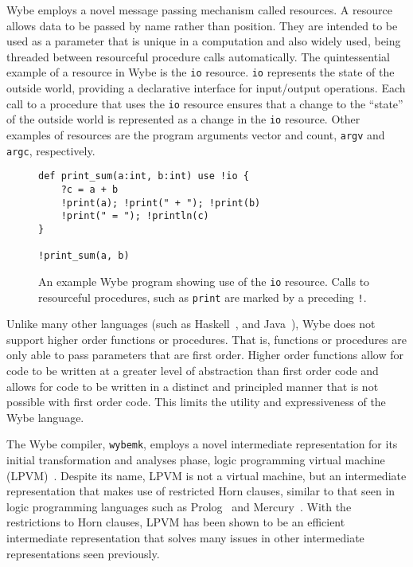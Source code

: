 Wybe employs a novel message passing mechanism called resources. A resource allows data to be passed by name rather than position. They are intended to be used as a parameter that is unique in a computation and also widely used, being threaded between resourceful procedure calls automatically. The quintessential example of a resource in Wybe is the \texttt{io} resource. \texttt{io} represents the state of the outside world, providing a declarative interface for input/output operations. Each call to a procedure that uses the \texttt{io} resource ensures that a change to the ``state'' of the outside world is represented as a change in the \texttt{io} resource. Other examples of resources are the program arguments vector and count, \texttt{argv} and \texttt{argc}, respectively.

\begin{figure}[ht]
  \centering
  \begin{varwidth}{\linewidth}
    \begin{verbatim}
def print_sum(a:int, b:int) use !io {
    ?c = a + b
    !print(a); !print(" + "); !print(b)
    !print(" = "); !println(c)
}

!print_sum(a, b)
\end{verbatim}
  \end{varwidth}
  \caption{An example Wybe program showing use of the \texttt{io} resource. Calls to resourceful procedures, such as \texttt{print} are marked by a preceding \texttt{!}.}
  \label{fig:wybe-resource-example}
\end{figure}

Unlike many other languages (such as Haskell~\cite{jones2003haskell}, and Java~\cite{mazinanian2017understanding}), Wybe does not support higher order functions or procedures. That is, functions or procedures are only able to pass parameters that are first order. Higher order functions allow for code to be written at a greater level of abstraction than first order code and allows for code to be written in a distinct and principled manner that is not possible with first order code. This limits the utility and expressiveness of the Wybe language.

The Wybe compiler, \texttt{wybemk}, employs a novel intermediate representation for its initial transformation and analyses phase, logic programming virtual machine (LPVM)~\cite{gange2015horn}. Despite its name, LPVM is not a virtual machine, but an intermediate representation that makes use of restricted Horn clauses, similar to that seen in logic programming languages such as Prolog~\cite{colmerauer1996birth} and Mercury~\cite{somogyi1996execution}. With the restrictions to Horn clauses, LPVM has been shown to be an efficient intermediate representation that solves many issues in other intermediate representations seen previously.

